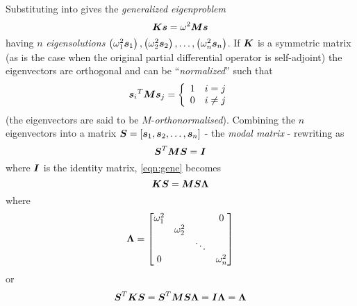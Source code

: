Substituting  into  gives the
\emph{generalized eigenproblem}
\begin{equation}
  \matr{K}\vect{s}=\omega^{2}\matr{M}\vect{s}
  \label{eqn:gene}
\end{equation}
having $n$ \emph{eigensolutions} $\pbrac{\omega_{1}^{2}\vect{s}_{1}},
\pbrac{\omega_{2}^{2}\vect{s}_{2}},\ldots,\pbrac{\omega_{n}^{2}\vect{s}_{n}}$.
If $\matr{K}$ is a symmetric matrix (as is the case when the original partial
differential operator is self-adjoint) the eigenvectors are orthogonal and can
be ``\emph{normalized}'' such that
\begin{equation}
  \transpose{\vect{s}_{i}}\matr{M}\vect{s}_{j}= \left\{
    \begin{array}{cc}
      1 & i=j\\
      0 & i \neq j
    \end{array} \right.
  \label{eqn:norm}
\end{equation}
(the eigenvectors are said to be $M$-\emph{orthonormalised}). Combining the
$n$ eigenvectors into a matrix $\matr{S} = \sqbrac{\vect{s}_{1}, \vect{s}_{2},\ldots,
\vect{s}_{n}}$ - the \emph{modal matrix} - rewriting  as
\begin{equation}
  \transpose{\matr{S}}\matr{M}\matr{S} = \matr{I}
  \label{eqn:mm}
\end{equation}
where $\matr{I}$ is the identity matrix, \eqref{eqn:gene} becomes
\begin{equation}
  \matr{K}\matr{S} = \matr{M}\matr{S}\matr{\Lambda}
  \label{eqn:id}
\end{equation}
where
\begin{equation}
  \matr{\Lambda} = \begin{bmatrix}
    \omega_{1}^{2} &  &  & 0 \\
    & \omega_{2}^{2} & & \\
    & & \ddots & \\
    0 & & & \omega_{n}^{2}
  \end{bmatrix}
  \label{eqn:lambda}
\end{equation} 
or
\begin{equation}
  \transpose{\matr{S}}\matr{K}\matr{S} =
  \transpose{\matr{S}}\matr{M}\matr{S}\matr{\Lambda} = \matr{I}\matr{\Lambda}
  = \matr{\Lambda} 
  \label{eqn:oreq}
\end{equation}

